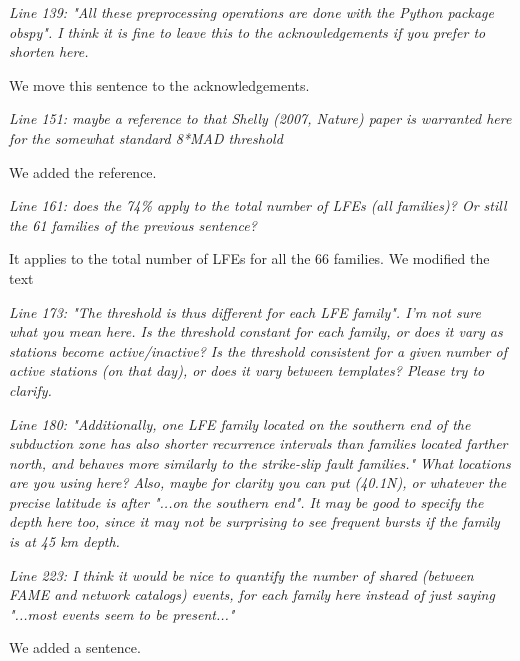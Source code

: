 \documentclass[letterpaper, 12pt]{article}
\begin{document}
\bigskip

\textit{Line 139: "All these preprocessing operations are done with the Python package obspy". I think it is fine to leave this to the acknowledgements if you prefer to shorten here.}

\bigskip

We move this sentence to the acknowledgements.

\bigskip

\textit{Line 151: maybe a reference to that Shelly (2007, Nature) paper is warranted here for the somewhat standard 8*MAD threshold}

\bigskip

We added the reference.

\bigskip

\textit{Line 161: does the 74\% apply to the total number of LFEs (all families)? Or still the 61 families of the previous sentence?}

\bigskip

It applies to the total number of LFEs for all the 66 families. We modified the text

\bigskip

\textit{Line 173: "The threshold is thus different for each LFE family". I'm not sure what you mean here. Is the threshold constant for each family, or does it vary as stations become active/inactive? Is the threshold consistent for a given number of active stations (on that day), or does it vary between templates? Please try to clarify.}

\bigskip

\textit{Line 180: "Additionally, one LFE family located on the southern end of the subduction zone has also shorter recurrence intervals than families located farther north, and behaves more similarly to the strike-slip fault families." What locations are you using here? Also, maybe for clarity you can put (40.1N), or whatever the precise latitude is after "...on the southern end". It may be good to specify the depth here too, since it may not be surprising to see frequent bursts if the family is at 45 km depth.}

\bigskip

\textit{Line 223: I think it would be nice to quantify the number of shared (between FAME and network catalogs) events, for each family here instead of just saying "...most events seem to be present..."}

\bigskip

We added a sentence.
\end{document}
